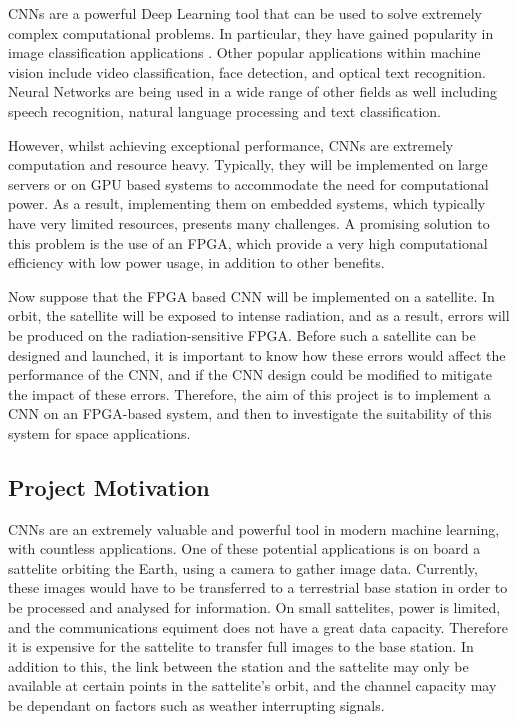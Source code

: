 \documentclass[12pt]{article}
\begin{document}
CNNs are a powerful Deep Learning tool that can be used to solve extremely complex computational problems. In particular, they have gained popularity in image classification applications \cite{ImageNetChallenge}. Other popular applications within machine vision include video classification, face detection, and optical text recognition. Neural Networks are being used in a wide range of other fields as well including speech recognition, natural language processing and text classification.

However, whilst achieving exceptional performance, CNNs are extremely computation and resource heavy. Typically, they will be implemented on large servers or on GPU based systems to accommodate the need for computational power. As a result, implementing them on embedded systems, which typically have very limited resources, presents many challenges. A promising solution to this problem is the use of an FPGA, which provide a very high computational efficiency with low power usage, in addition to other benefits.

Now suppose that the FPGA based CNN will be implemented on a satellite. In orbit, the satellite will be exposed to intense radiation, and as a result, errors will be produced on the radiation-sensitive FPGA. Before such a satellite can be designed and launched, it is important to know how these errors would affect the performance of the CNN, and if the CNN design could be modified to mitigate the impact of these errors. Therefore, the aim of this project is to implement a CNN on an FPGA-based system, and then to investigate the suitability of this system for space applications.

\subsection{Project Motivation}
\label{sec:Intro-ProjectMotivation}

CNNs are an extremely valuable and powerful tool in modern machine learning, with countless applications. One of these potential applications is on board a sattelite orbiting the Earth, using a camera to gather image data. Currently, these images would have to be transferred to a terrestrial base station in order to be processed and analysed for information. On small sattelites, power is limited, and the communications equiment does not have a great data capacity. Therefore it is expensive for the sattelite to transfer full images to the base station. In addition to this, the link between the station and the sattelite may only be available at certain points in the sattelite's orbit, and the channel capacity may be dependant on factors such as weather interrupting signals. 
\end{document}

